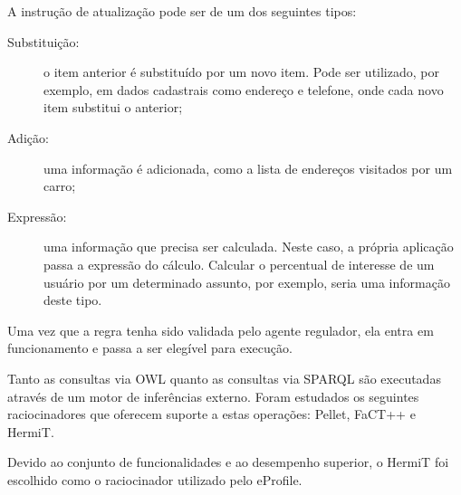A instrução de atualização pode ser de um dos seguintes tipos:

\begin{description}

  \item[Substituição:] o item anterior é substituído por um novo item. Pode ser utilizado, por exemplo, em dados cadastrais como endereço e telefone, onde cada novo item substitui o anterior;

  \item[Adição:] uma informação é adicionada, como a lista de endereços visitados por um carro;

  \item[Expressão:] uma informação que precisa ser calculada. Neste caso, a própria aplicação passa a expressão do cálculo. Calcular o percentual de interesse de um usuário por um determinado assunto, por exemplo, seria uma informação deste tipo.

\end{description}

Uma vez que a regra tenha sido validada pelo agente regulador, ela entra em funcionamento e passa a ser elegível para execução.

Tanto as consultas via OWL quanto as consultas via SPARQL são executadas através de um motor de inferências externo. Foram estudados os seguintes raciocinadores que oferecem suporte a estas operações: Pellet\cite{sirin05}, FaCT++\cite{tsarkov06} e HermiT\cite{motik09}.

Devido ao conjunto de funcionalidades e ao desempenho superior, o HermiT foi escolhido como o raciocinador utilizado pelo eProfile.
